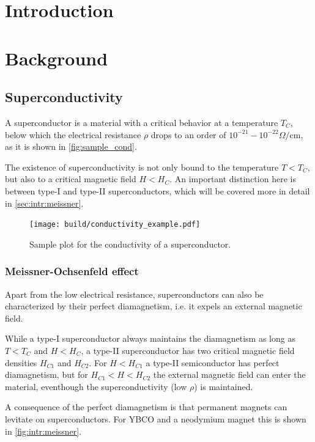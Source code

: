 \section{Introduction}
\label{sec:introduction}

\section{Background}
\label{sec:Background}

\subsection{Superconductivity}
\label{sec:Superconductivity}
A superconductor is a material with a critical behavior at a temperature $T_C$, below which the
electrical resistance $\rho$ drops to an order of $10^{-21} - 10^{-22} \Omega / \text{cm}$, as it is shown
in \autoref{fig:sample_cond}. 

The existence of superconductivity is not only bound to the temperature $T<T_C$, but also to a
critical magnetic field $H < H_C$. An important distinction here is between type-I and type-II
superconductors, which will be covered more in detail in \autoref{sec:intr:meissner}.

\begin{figure}
  \centering
  \texttt{[image: build/conductivity\_example.pdf]}
  \caption{Sample plot for the conductivity of a superconductor.}
  \label{fig:sample_cond}
\end{figure}

\subsubsection{Meissner-Ochsenfeld effect}
\label{sec:intr:meissner}
Apart from the low electrical resistance, superconductors can also be characterized by their perfect
diamagnetism, i.e. it expels an external magnetic field. 

While a type-I superconductor always maintains the diamagnetism as long as $T < T_C$ and $H < H_C$, a type-II
superconductor has two critical magnetic field densities $H_{C1}$ and $H_{C2}$. For $H < H_{C1}$ a
type-II semiconductor has perfect diamagnetism, but for $H_{C1} < H < H_{C2}$ the external magnetic
field can enter the material, eventhough the superconductivity (low $\rho$) is
maintained.

A consequence of the perfect diamagnetism is that permanent magnets can levitate on superconductors.
For YBCO and a neodymium magnet this is shown in \autoref{fig:intr:meissner}.

